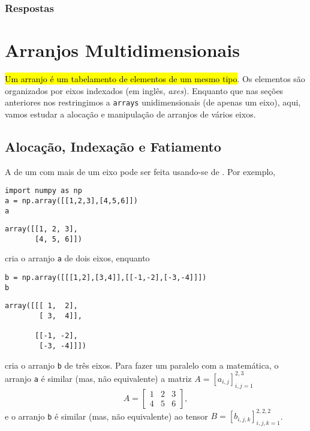 \ifisbook
\subsubsection{Respostas}
\shipoutAnswer
\fi

\section{Arranjos Multidimensionais}\label{cap_arr_sec_multi}

\hl{Um arranjo {\PYTHONnumpyDOTarray} é um tabelamento de elementos de um mesmo tipo}. Os elementos são organizados por eixos indexados (em inglês, \textit{axes}). Enquanto que nas seções anteriores nos restringimos a \texttt{arrays} unidimensionais (de apenas um eixo), aqui, vamos estudar a alocação e manipulação de arranjos de vários eixos.

\subsection{Alocação, Indexação e Fatiamento}

A  de um {\PYTHONnumpyDOTarray} com mais de um eixo pode ser feita usando-se de . Por exemplo,

\begin{lstlisting}
import numpy as np
a = np.array([[1,2,3],[4,5,6]])
a
\end{lstlisting}

\begin{verbatim}
array([[1, 2, 3],
       [4, 5, 6]])
\end{verbatim}

cria o arranjo \lstinline+a+ de dois eixos, enquanto

\begin{lstlisting}
b = np.array([[[1,2],[3,4]],[[-1,-2],[-3,-4]]])
b
\end{lstlisting}

\begin{verbatim}
array([[[ 1,  2],
        [ 3,  4]],

       [[-1, -2],
        [-3, -4]]])
\end{verbatim}

cria o arranjo \lstinline+b+ de três eixos. Para fazer um paralelo com a matemática, o arranjo \lstinline+a+ é similar (mas, não equivalente) a matriz $A = [a_{i,j}]_{i,j=1}^{2,3}$
\begin{equation}
  A =
  \begin{bmatrix}
    1 & 2 & 3\\
    4 & 5 & 6
  \end{bmatrix},
\end{equation}
e o arranjo \lstinline+b+ é similar (mas, não equivalente) ao tensor $B = [b_{i,j,k}]_{i,j,k=1}^{2,2,2}$.

